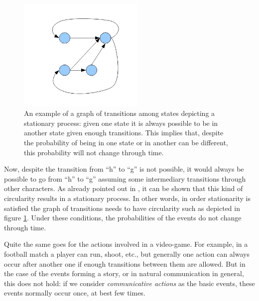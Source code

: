 \documentclass[
		twoside,openright,titlepage,numbers=noenddot,manychapters,
		headinclude,%
                footinclude=false,cleardoublepage=empty,
                BCOR=5mm,
		fontsize=11pt, %
                 enabledeprecatedfontcommands]{scrreprt}
\begin{document}
\begin{figure}[tb]
\begin{center}
\includegraphics[width=6cm]{figures/circular_graph2.png}
\caption{An example of a graph of transitions among states depicting a stationary process: given one state it is always possible to be in another state given enough transitions. This implies that, despite the probability of being in one state or in another can be different, this probability will not change through time. }
\label{fig_circular_graph}
\end{center}
\end{figure}

Now, despite the transition from ``h'' to ``g'' is not possible, it would always be possible to go from ``h'' to ``g'' assuming some intermediary transitions through other characters. As already pointed out in \cite{shannon48}, it can be shown that this kind of circularity results in a stationary process. In other words, in order stationarity is satisfied the graph of transitions needs to have circularity such as depicted in figure \ref{fig_circular_graph}. Under these conditions, the probabilities of the events do not change through time. 

 Quite the same goes for the actions involved in a video-game. For example, in a football match a player can run, shoot, etc., but generally one action can always occur after another one if enough transitions between them are allowed. But in the case of the events forming a story, or in natural communication in general, this does not hold: if we consider \emph{communicative actions} as the basic events, these events normally occur once, at best few times. %

\end{document}
